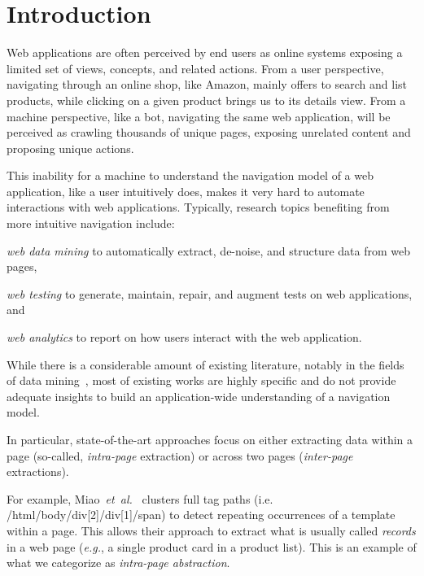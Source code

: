 \message{ !name(appstract.tex)}\documentclass[sigconf,authordraft]{acmart}
\theoremstyle{definition}
\begin{document}
\section{Introduction}
Web applications are often perceived by end users as online systems exposing a limited set of views, concepts, and related actions.
From a user perspective, navigating through an online shop, like Amazon, mainly offers to search and list products, while clicking on a given product brings us to its details view. 
From a machine perspective, like a bot, navigating the same web application, will be perceived as crawling thousands of unique pages, exposing unrelated content and proposing unique actions.

This inability for a machine to understand the navigation model of a web application, like a user intuitively does, makes it very hard to automate interactions with web applications.
Typically, research topics benefiting from more intuitive navigation include:
\begin{inparaenum}[\it (a)]
    \item \emph{web data mining} to automatically extract, de-noise, and structure data from web pages,
    \item \emph{web testing} to generate, maintain, repair, and augment tests on web applications, and
    \item \emph{web analytics} to report on how users interact with the web application.
\end{inparaenum}

While there is a considerable amount of existing literature, notably in the fields of data mining~\cite{Zhai2005WebAlignment, ArasuExtractingPages, Crescenzi2001RoadRunner:Sites, Sarawagi1996InformationExtraction, ChaudhariTemplatePages, MiaoExtractingClustering}, most of existing works are highly specific and do not provide adequate insights to build an application-wide understanding of a navigation model.

In particular, state-of-the-art approaches focus on either extracting data within a page (so-called, \emph{intra-page} extraction) or across two pages (\emph{inter-page} extractions). 

For example, Miao~\textit{et~al.}~\cite{MiaoExtractingClustering} clusters full tag paths (i.e. /html/body/div[2]/div[1]/span) to detect repeating occurrences of a template within a page.
This allows their approach to extract what is usually called \emph{records} in a web page (\emph{e.g.}, a single product card in a product list).
This is an example of what we categorize as \emph{intra-page abstraction}.
\end{document}
